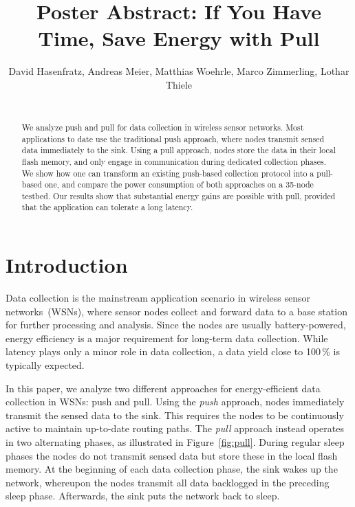 \documentclass[10pt]{sensys-abstract}
\newcommand\figref[1]{Figure~\ref{#1}}
\begin{document}
\title{Poster Abstract: If You Have Time, Save Energy with Pull}

\author{
\alignauthor David Hasenfratz, Andreas Meier, Matthias Woehrle, Marco Zimmerling, Lothar Thiele\\
\\}

\maketitle

\begin{abstract}
We analyze push and pull for data collection in wireless sensor networks. Most applications to date use the traditional push approach, where nodes transmit sensed data immediately to the sink. Using a pull approach, nodes store the data in their local flash memory, and only engage in communication during dedicated collection phases. We show how one can transform an existing push-based collection protocol into a pull-based one, and compare the power consumption of both approaches on a 35-node testbed. Our results show that substantial energy gains are possible with pull, provided that the application can tolerate a long latency.
\end{abstract}

\section{Introduction}

Data collection is the mainstream application scenario in wireless sensor networks~(WSNs), where sensor nodes collect and forward data to a base station for further processing and analysis. Since the nodes are usually battery-powered, energy efficiency is a major requirement for long-term data collection. While latency plays only a minor role in data collection, a data yield close to 100$\,$\% is typically expected.

In this paper, we analyze two different approaches for energy-efficient data collection in WSNs: push and pull. Using the \emph{push} approach, nodes immediately transmit the sensed data to the sink. This requires the nodes to be continuously active to maintain up-to-date routing paths. The \emph{pull} approach instead operates in two alternating phases, as illustrated in \figref{fig:pull}. During regular sleep phases the nodes do not transmit sensed data but store these in the local flash memory. At the beginning of each data collection phase, the sink wakes up the network, whereupon the nodes transmit all data backlogged in the preceding sleep phase. Afterwards, the sink puts the network back to sleep.
\end{document}
